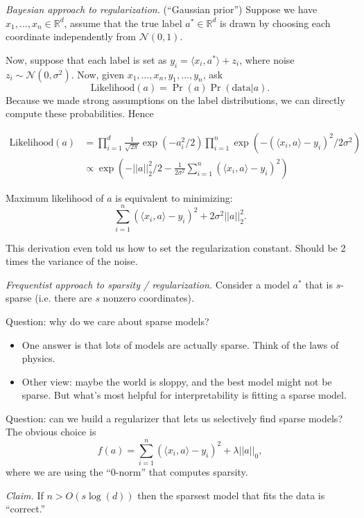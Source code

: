 \documentclass[12pt]{article}
\newcommand{\RR}{\mathbb{R}}
\newcommand{\NN}{\mathcal{N}}
\begin{document}
{\it Bayesian approach to regularization.} (``Gaussian prior'') Suppose we have $x_1, \dots, x_n \in \RR^d$, assume that the true label $a^{*} \in \RR^d$ is drawn by choosing each coordinate independently from $\NN(0, 1)$.

Now, suppose that each label is set as $y_i = \langle x_i, a^{*} \rangle + z_i$, where noise $z_i \sim \NN(0, \sigma^2)$.  Now, given $x_1, \dots, x_n, y_1, \dots, y_n$, ask
\[
  \text{Likelihood}(a) = \Pr(a) \Pr(\text{data} | a).
\]
Because we made strong assumptions on the label distributions, we can directly compute these probabilities.  Hence

\begin{align*}
  \text{Likelihood}(a) &= \prod_{i=1}^{d} \frac{1}{\sqrt{2\pi}}\exp (- a_i^2 / 2) \prod_{i=1}^{n} \exp (- (\langle x_i, a \rangle - y_i)^2 / 2 \sigma^2) \\
  &\propto \exp (-||a||_2^2 / 2 - \frac{1}{2 \sigma^2} \sum_{i=1}^{n} \left( \langle x_i, a \rangle - y_i\right)^2)
\end{align*}

Maximum likelihood of $a$ is equivalent to minimizing:
\[
  \sum_{i=1}^{n} \left( \langle x_i, a \rangle - y_i \right)^2 + 2 \sigma^2 ||a||_{2}^{2}.
\]

This derivation even told us how to set the regularization constant.  Should be 2 times the variance of the noise.

{\it Frequentist approach to sparsity / regularization.} Consider a model $a^{*}$ that is $s$-sparse (i.e. there are $s$ nonzero coordinates).  

Question: why do we care about sparse models?

\begin{itemize}
  \item One answer is that lots of models are actually sparse.  Think of the laws of physics.
  \item Other view: maybe the world is sloppy, and the best model might not be sparse.  But what's most helpful for interpretability is fitting a sparse model.
\end{itemize}

Question: can we build a regularizer that lets us selectively find sparse models?  The obvious choice is
\[
  f(a) = \sum_{i=1}^{n} \left( \langle x_i, a \rangle - y_i \right)^2 + \lambda ||a||_0,
\]
where we are using the ``0-norm'' that computes sparsity.

{\it Claim.} If $n > O (s \log (d))$ then the sparsest model that fits the data is ``correct.''
\end{document}
